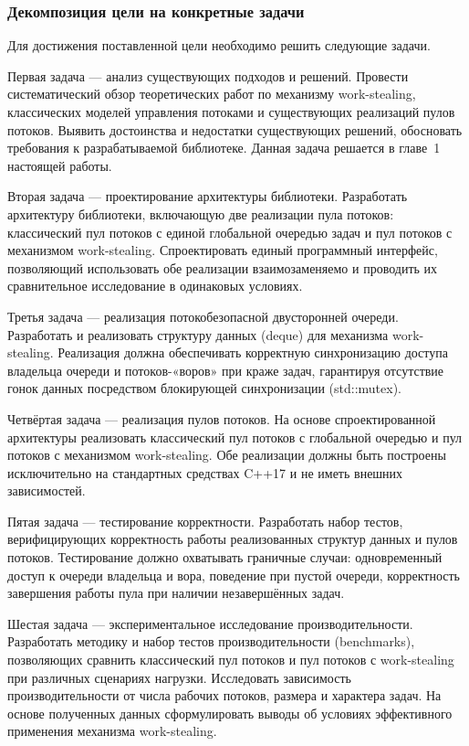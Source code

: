 \subsubsection{Декомпозиция цели на конкретные задачи}

Для достижения поставленной цели необходимо решить следующие задачи.

Первая задача --- анализ существующих подходов и решений.
Провести систематический обзор теоретических работ по механизму
work-stealing, классических моделей управления потоками и существующих
реализаций пулов потоков. Выявить достоинства и недостатки
существующих решений, обосновать требования к разрабатываемой
библиотеке. Данная задача решается в главе~1 настоящей работы.

Вторая задача --- проектирование архитектуры библиотеки.
Разработать архитектуру библиотеки, включающую две реализации
пула потоков: классический пул потоков с единой глобальной очередью
задач и пул потоков с механизмом work-stealing. Спроектировать
единый программный интерфейс, позволяющий использовать обе
реализации взаимозаменяемо и проводить их сравнительное
исследование в одинаковых условиях.

Третья задача --- реализация потокобезопасной двусторонней очереди. 
Разработать и реализовать структуру данных (deque) для механизма work-stealing. 
Реализация должна обеспечивать корректную синхронизацию доступа владельца очереди и потоков-«воров» при краже задач, гарантируя отсутствие гонок данных посредством блокирующей синхронизации (std::mutex).

Четвёртая задача --- реализация пулов потоков.
На основе спроектированной архитектуры реализовать классический
пул потоков с глобальной очередью и пул потоков с механизмом
work-stealing. Обе реализации должны быть построены исключительно
на стандартных средствах C++17 и не иметь внешних
зависимостей.

Пятая задача --- тестирование корректности.
Разработать набор тестов, верифицирующих корректность работы
реализованных структур данных и пулов потоков. Тестирование должно
охватывать граничные случаи: одновременный доступ к очереди
владельца и вора, поведение при пустой очереди, корректность
завершения работы пула при наличии незавершённых задач.

Шестая задача --- экспериментальное исследование производительности.
Разработать методику и набор тестов производительности (benchmarks),
позволяющих сравнить классический пул потоков и пул потоков
с work-stealing при различных сценариях нагрузки. Исследовать
зависимость производительности от числа рабочих потоков, размера
и характера задач. На основе полученных данных сформулировать
выводы об условиях эффективного применения механизма work-stealing.

